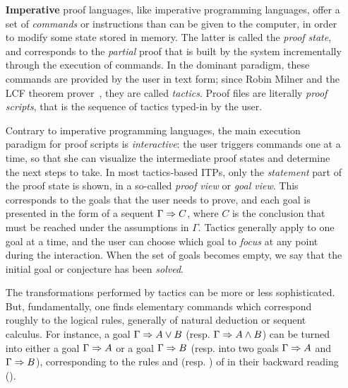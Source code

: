 \begin{itemize}
  \item[\textbf{Imperative}] proof languages, like imperative programming
  languages, offer a set of \emph{commands} or instructions than can be given to
  the computer, in order to modify some state stored in memory. The latter is
  called the \emph{proof state}, and corresponds to the \emph{partial} proof
  that is built by the system incrementally through the execution of commands.
  In the dominant paradigm, these commands are provided by the user in text
  form; since Robin Milner and the LCF theorem
  prover~, they are called \emph{tactics}.
  Proof files are literally \emph{proof scripts}, that is the sequence of
  tactics typed-in by the user.
  
  Contrary to imperative programming languages, the main execution paradigm for
  proof scripts is \emph{interactive}: the user triggers commands one at a time,
  so that she can visualize the intermediate proof states and determine the next
  steps to take. In most tactics-based ITPs,
  only the \emph{statement} part of the proof state is shown, in a so-called
  \emph{proof view} or \emph{goal view}. This corresponds to the goals that the
  user needs to prove, and each goal is presented in the form of a sequent
  $\Gamma \Rightarrow C$, where $C$ is the conclusion that must be reached under the
  assumptions in $\Gamma$. Tactics generally apply to one goal at a time, and
  the user can choose which goal to \emph{focus} at any point during the
  interaction. When the set of goals becomes empty, we say that the initial goal
  or conjecture has been \emph{solved}.

  The transformations performed by tactics can be more or less sophisticated.
  But, fundamentally, one finds elementary commands which correspond roughly to
  the logical rules, generally of natural deduction or sequent calculus. For
  instance, a goal $\Gamma\Rightarrow A\lor B$ (resp. $\Gamma\Rightarrow A\land B$) can be
  turned into either a goal $\Gamma\Rightarrow A$ or a goal $\Gamma\Rightarrow B$ (resp. into
  two goals $\Gamma\Rightarrow A$ and $\Gamma\Rightarrow B$), corresponding to the rules
   and  (resp. ) of  in their
  backward reading ().


\end{itemize}

